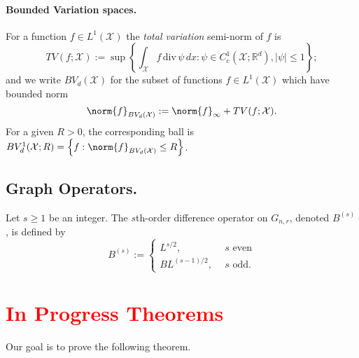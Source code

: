 \documentclass{article}
\newcommand{\Reals}{\mathbb{R}}
\newcommand{\abs}[1]{\left \lvert #1 \right \rvert}
\newcommand{\set}[1]{\left\{#1\right\}}
\newcommand{\1}{\mathbf{1}}
\newcommand{\Xsetive}{\mathrm{div}}
\theoremstyle{alden}
\theoremstyle{aldenthm}
\theoremstyle{definition}
\theoremstyle{remark}
\begin{document}
\paragraph{Bounded Variation spaces.}

For a function $f \in L^1(\mathcal{X})$ the \emph{total variation} semi-norm of $f$ is
\begin{equation*}
TV(f;\mathcal{X}) := \sup \left\{ \int_{\mathcal{X}} f \, \Xsetive \, \psi \,dx : \psi \in C_c^1(\mathcal{X}; \Reals^d), \abs{\psi} \leq 1 \right\};
\end{equation*}
and we write $BV_d(\mathcal{X})$ for the subset of functions $f \in L^1(\mathcal{X})$ which have bounded norm
\begin{equation*}
\norm{f}_{BV_d(\mathcal{X})} := \norm{f}_{\infty} + TV(f;\mathcal{X}).
\end{equation*}
For a given $R > 0$, the corresponding ball is $BV_d^{1}(\mathcal{X};R) = \set{f: \norm{f}_{BV_d(\mathcal{X})} \leq R}$. 

\subsection{Graph Operators.}
Let $s \geq 1$ be an integer. The $s$th-order difference operator on $G_{n,r}$, denoted $B^{(s)}$, is defined by
\begin{equation*}
B^{(s)} :=
\begin{cases}
L^{s/2},& ~~ s \textrm{ even} \\
BL^{(s - 1)/2},& ~~ s \textrm{ odd.}
\end{cases}
\end{equation*}

\section{\textcolor{red}{In Progress Theorems}}

Our goal is to prove the following theorem.
\end{document}
